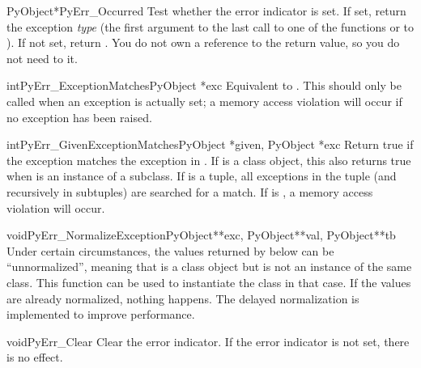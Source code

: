 \begin{cfuncdesc}{PyObject*}{PyErr_Occurred}{}
  Test whether the error indicator is set.  If set, return the
  exception \emph{type} (the first argument to the last call to one of
  the  functions or to
  ).  If not set, return \NULL.  You do
  not own a reference to the return value, so you do not need to
   it.  
\end{cfuncdesc}

\begin{cfuncdesc}{int}{PyErr_ExceptionMatches}{PyObject *exc}
  Equivalent to .  This should only be called when an exception is
  actually set; a memory access violation will occur if no exception
  has been raised.
\end{cfuncdesc}

\begin{cfuncdesc}{int}{PyErr_GivenExceptionMatches}{PyObject *given, PyObject *exc}
  Return true if the  exception matches the exception in
  .  If  is a class object, this also returns true
  when  is an instance of a subclass.  If  is a
  tuple, all exceptions in the tuple (and recursively in subtuples)
  are searched for a match.  If  is \NULL, a memory access
  violation will occur.
\end{cfuncdesc}

\begin{cfuncdesc}{void}{PyErr_NormalizeException}{PyObject**exc, PyObject**val, PyObject**tb}
  Under certain circumstances, the values returned by
   below can be ``unnormalized'', meaning
  that  is a class object but  is
  not an instance of the  same class.  This function can be used to
  instantiate the class in that case.  If the values are already
  normalized, nothing happens.  The delayed normalization is
  implemented to improve performance.
\end{cfuncdesc}

\begin{cfuncdesc}{void}{PyErr_Clear}{}
  Clear the error indicator.  If the error indicator is not set, there
  is no effect.
\end{cfuncdesc}

